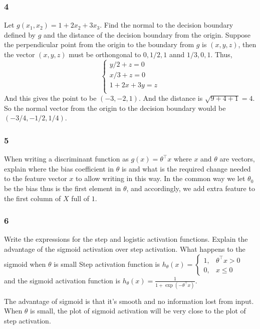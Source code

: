 \documentclass{article}
\begin{document}
\subsubsection*{4}
\begin{myleftlinebox}
    Let \(g(x_1,x_2)=1+2x_2+3x_3\). Find the normal to the decision boundary defined by \(g\) and the distance of the decision boundary from the origin.
    \tcblower
    Suppose the perpendicular point from the origin to the boundary from \(g\) is \((x,y,z)\), then the vector \((x,y,z)\) must be orthongonal to \(0,1/2,1\) annd \(1/3,0,1\). Thus,
    \[\begin{cases}
        y/2+z=0\\
        x/3+z=0\\
        1+2x+3y=z\\
    \end{cases}\]
    And this gives the point to be \((-3,-2,1)\). And the distance is \(\sqrt{9+4+1}=4\). So the normal vector from the origin to the decision boundary would be \((-3/4,-1/2,1/4)\).
\end{myleftlinebox}

\subsubsection*{5}
\begin{myleftlinebox}
    When writing a discriminant function as \(g(x)=\theta^\top x\) where \(x\) and \(\theta\) are vectors, explain where the bias coefficient in \(\theta\) is and what is the required change needed to the feature vector \(x\) to allow writing in this way.
    \tcblower
    In the common way we let \(\theta_0\) be the bias thus is the first element in \(\theta\), and accordingly, we add extra feature to the first column of \(X\) full of \(1\).
\end{myleftlinebox}

\subsubsection*{6}
\begin{myleftlinebox}
    Write the expressions for the step and logistic activation functions. Explain the advantage of the sigmoid activation over step activation. What happens to the sigmoid when \(\theta \) is small
    \tcblower
    Step activation function is \(h_\theta(x) = \begin{cases}
        1, & \theta^\top x>0\\
        0,& x\leq 0
    \end{cases}\) and the sigmoid activation function is \(h_\theta(x)=\frac{1}{1+\exp(-\theta^\top x)}\).
    
    The advantage of sigmoid is that it's smooth and no information lost from input. When \(\theta\) is small, the plot of sigmoid activation will be very close to the plot of step activation.
\end{myleftlinebox}
\end{document}
